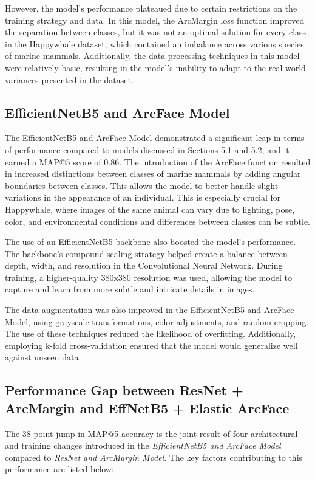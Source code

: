 \documentclass[twocolumn]{article}
\begin{document}
However, the model's performance plateaued due to certain restrictions on the training strategy and data. In this model, the ArcMargin loss function improved the separation between classes, but it was not an optimal solution for every class in the Happywhale dataset, which contained an imbalance across various species of marine mammals. Additionally, the data processing techniques in this model were relatively basic, resulting in the model's inability to adapt to the real-world variances presented in the dataset.

\subsection{EfficientNetB5 and ArcFace Model}

The EfficientNetB5 and ArcFace Model demonstrated a significant leap in terms of performance compared to models discussed in Sections 5.1 and 5.2, and it earned a MAP@5 score of 0.86. The introduction of the ArcFace function resulted in increased distinctions between classes of marine mammals by adding angular boundaries between classes. This allows the model to better handle slight variations in the appearance of an individual. This is especially crucial for Happywhale, where images of the same animal can vary due to lighting, pose, color, and environmental conditions and differences between classes can be subtle.

The use of an EfficientNetB5 backbone also boosted the model's performance. The backbone's compound scaling strategy helped create a balance between depth, width, and resolution in the Convolutional Neural Network. During training, a higher-quality 380x380 resolution was used, allowing the model to capture and learn from more subtle and intricate details in images.

The data augmentation was also improved in the EfficientNetB5 and ArcFace Model, using grayscale transformations, color adjustments, and random cropping. The use of these techniques reduced the likelihood of overfitting. Additionally, employing k-fold cross-validation ensured that the model would generalize well against unseen data. 

\subsection{Performance Gap between ResNet + ArcMargin and EffNetB5 + Elastic ArcFace}

The 38-point jump in MAP@5 accuracy is the joint result of four architectural and training changes introduced in the \textit{EfficientNetB5 and ArcFace Model} compared to \textit{ResNet and ArcMargin Model}. The key factors contributing to this performance are listed below:
\end{document}
